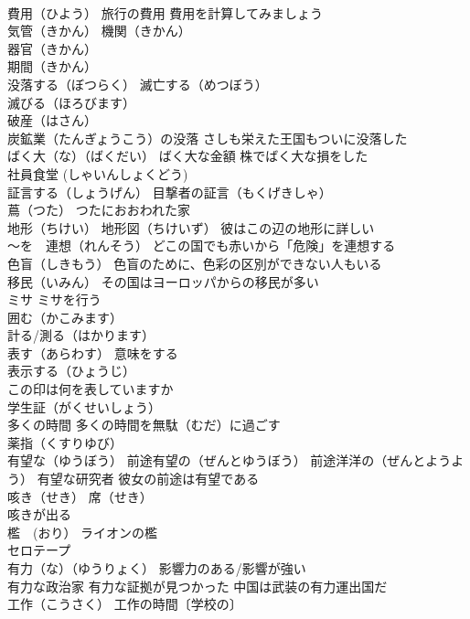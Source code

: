 \documentclass[8pt]{extreport}
\begin{document}
\begin{CJK}{UTF8}{min}
\\	費用（ひよう） 旅行の費用 費用を計算してみましょう
\\	気管（きかん） 機関（きかん）
\\	器官（きかん）
\\	期間（きかん）
\\	没落する（ぼつらく） 滅亡する（めつぼう）
\\	滅びる（ほろびます）
\\	破産（はさん）
\\	炭鉱業（たんぎょうこう）の没落 さしも栄えた王国もついに没落した
\\	ばく大（な）（ばくだい） ばく大な金額 株でばく大な損をした
\\	社員食堂 (しゃいんしょくどう)
\\	証言する（しょうげん） 目撃者の証言（もくげきしゃ）
\\	蔦（つた） つたにおおわれた家
\\	地形（ちけい） 地形図（ちけいず） 彼はこの辺の地形に詳しい
\\	～を　連想（れんそう） どこの国でも赤いから「危険」を連想する
\\	色盲（しきもう） 色盲のために、色彩の区別ができない人もいる
\\	移民（いみん） その国はヨーロッパからの移民が多い
\\	ミサ ミサを行う
\\	囲む（かこみます）
\\	計る/測る（はかります）
\\	表す（あらわす） 意味をする 
\\	表示する（ひょうじ）
\\	この印は何を表していますか
\\	学生証（がくせいしょう）
\\	多くの時間 多くの時間を無駄（むだ）に過ごす
\\	薬指（くすりゆび）
\\	有望な（ゆうぼう） 前途有望の（ぜんとゆうぼう） 前途洋洋の（ぜんとようよう） 有望な研究者 彼女の前途は有望である
\\	咳き（せき） 席（せき）
\\	咳きが出る
\\	檻　(おり） ライオンの檻
\\	セロテープ
\\	有力（な）（ゆうりょく） 影響力のある/影響が強い 
\\	有力な政治家 有力な証拠が見つかった 中国は武装の有力運出国だ
\\	工作（こうさく） 工作の時間〔学校の〕

\end{CJK}
\end{document}
